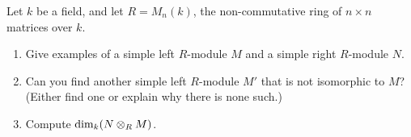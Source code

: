 \begin{question}[subtitle = January 2021 Problem 2,ID=Jan21_2]
Let $k$ be a field, and let $R = M_n(k)$, the non-commutative ring of $n \times n$ matrices over $k$.
\begin{enumerate}
    \item Give examples of a simple left $R$-module $M$ and a simple right $R$-module $N$.
    \item Can you find another simple left $R$-module $M'$ that is not isomorphic to $M$? (Either find one or explain why there is none such.)
    \item Compute $\dim_k (N \otimes_R M)$.
\end{enumerate}
\end{question}
